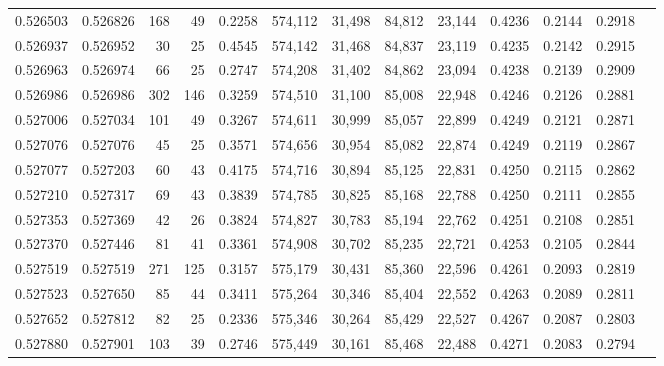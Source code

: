 \begin{tabular}{rrrrrrrrrrrrr}
0.526503 & 0.526826 &   168 &    49 &                                     0.2258 & 574,112 &  31,498 &  84,812 &  23,144 & 0.4236 & 0.2144 & 0.2918 \\
0.526937 & 0.526952 &    30 &    25 &                                     0.4545 & 574,142 &  31,468 &  84,837 &  23,119 & 0.4235 & 0.2142 & 0.2915 \\
0.526963 & 0.526974 &    66 &    25 &                                     0.2747 & 574,208 &  31,402 &  84,862 &  23,094 & 0.4238 & 0.2139 & 0.2909 \\
0.526986 & 0.526986 &   302 &   146 &                                     0.3259 & 574,510 &  31,100 &  85,008 &  22,948 & 0.4246 & 0.2126 & 0.2881 \\
0.527006 & 0.527034 &   101 &    49 &                                     0.3267 & 574,611 &  30,999 &  85,057 &  22,899 & 0.4249 & 0.2121 & 0.2871 \\
0.527076 & 0.527076 &    45 &    25 &                                     0.3571 & 574,656 &  30,954 &  85,082 &  22,874 & 0.4249 & 0.2119 & 0.2867 \\
0.527077 & 0.527203 &    60 &    43 &                                     0.4175 & 574,716 &  30,894 &  85,125 &  22,831 & 0.4250 & 0.2115 & 0.2862 \\
0.527210 & 0.527317 &    69 &    43 &                                     0.3839 & 574,785 &  30,825 &  85,168 &  22,788 & 0.4250 & 0.2111 & 0.2855 \\
0.527353 & 0.527369 &    42 &    26 &                                     0.3824 & 574,827 &  30,783 &  85,194 &  22,762 & 0.4251 & 0.2108 & 0.2851 \\
0.527370 & 0.527446 &    81 &    41 &                                     0.3361 & 574,908 &  30,702 &  85,235 &  22,721 & 0.4253 & 0.2105 & 0.2844 \\
0.527519 & 0.527519 &   271 &   125 &                                     0.3157 & 575,179 &  30,431 &  85,360 &  22,596 & 0.4261 & 0.2093 & 0.2819 \\
0.527523 & 0.527650 &    85 &    44 &                                     0.3411 & 575,264 &  30,346 &  85,404 &  22,552 & 0.4263 & 0.2089 & 0.2811 \\
0.527652 & 0.527812 &    82 &    25 &                                     0.2336 & 575,346 &  30,264 &  85,429 &  22,527 & 0.4267 & 0.2087 & 0.2803 \\
0.527880 & 0.527901 &   103 &    39 &                                     0.2746 & 575,449 &  30,161 &  85,468 &  22,488 & 0.4271 & 0.2083 & 0.2794 \\

\end{tabular}
